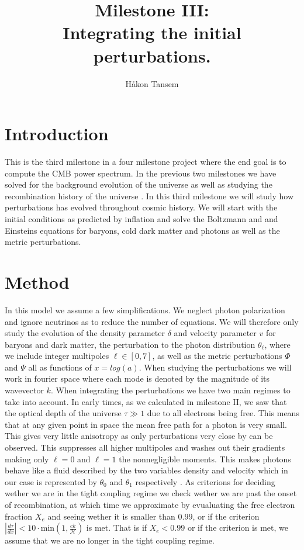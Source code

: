 \documentclass[onecolumn]{aastex62}
\begin{document}
\title{\Large Milestone III:\\Integrating the initial perturbations.}


\author{Håkon Tansem}

\section{Introduction} \label{sec:intro}
This is the third milestone in a four milestone project where the end goal is to compute the CMB power spectrum. In the previous two milestones we have solved for the background evolution of the universe \cite{TansemI:2020} as well as studying the recombination history of the universe \cite{TansemII:2020}. In this third milestone we will study how perturbations has evolved throughout cosmic history. We will start with the initial conditions as predicted by inflation and solve the Boltzmann and and Einsteins equations for baryons, cold dark matter and photons as well as the metric perturbations.
\section{Method} \label{sec:method}
In this model we assume a few simplifications. We neglect photon polarization and ignore neutrinos as to reduce the number of equations. We will therefore only study the evolution of the density parameter $\delta$ and velocity parameter $v$ for baryons and dark matter, the perturbation to the photon distribution $\theta_{\ell}$, where we include integer multipoles $\ell\in[0, 7]$, as well as the metric perturbations $\Phi$ and $\Psi$ all as functions of $x=log(a)$. When studying the perturbations we will work in fourier space where each mode is denoted by the magnitude of its wavevector $k$. When integrating the perturbations we have two main regimes to take into account. In early times, as we calculated in milestone II, we saw that the optical depth of the universe $\tau\gg1$ due to all electrons being free. This means that at any given point in space the mean free path for a photon is very small. This gives very little anisotropy as only perturbations very close by can be observed. This suppresses all higher multipoles and washes out their gradients making only $\ell=0$ and $\ell=1$ the nonnegligible moments. This makes photons behave like a fluid described by the two variables density and velocity which in our case is represented by $\theta_0$ and $\theta_1$ respectively \citep[p. 225]{Dodelson:1282338}. As criterions for deciding wether we are in the tight coupling regime we check wether we are past the onset of recombination, at which time we approximate by evualuating the free electron fraction $X_e$ and seeing wether it is smaller than $0.99$, or if the criterion $\left|\frac{d\tau}{dx}\right| < 10 \cdot \text{min}(1, \frac{ck}{\mathcal{H}})$ is met. That is if $X_e < 0.99$ or if the criterion is met, we assume that we are no longer in the tight coupling regime.\\\indent
\end{document}
